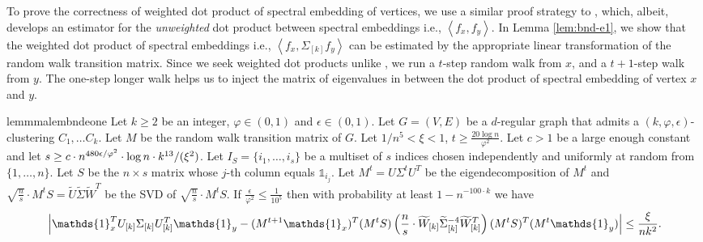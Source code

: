 \documentclass[letterpaper,11pt]{article}
\theoremstyle{plain}
\theoremstyle{definition}
\theoremstyle{remark}
\newcommand{\rdp}[1]
  {\ensuremath{\left\langle #1 \right\rangle}}
\newcommand{\mycolor}[1]{\textcolor{black}{#1}}
\begin{document}
To prove the correctness of weighted dot product of spectral embedding of vertices, we use a similar proof strategy to \cite{GluchKLMS21},  
which, albeit, develops an 
estimator for the \emph{unweighted} dot product  between spectral embeddings i.e., $\rdp{f_x, f_y}$. In Lemma \ref{lem:bnd-e1}, we show that the weighted dot product of
spectral embeddings i.e.,  $\rdp{f_x, \Sigma_{[k]}f_y}$ can be estimated by the appropriate linear transformation of the random walk transition matrix. Since we seek weighted dot products unlike \cite{GluchKLMS21},  we run a $t$-step random walk from $x$, and a $t+1$-step walk from $y$. The one-step longer walk helps us to inject the matrix of eigenvalues in between the dot product of spectral embedding of vertex $x$ and $y$. 



\begin{restatable}{lemmma}{lembndeone}
\label{lem:bnd-e1}
Let $k \geq 2$ be an integer, $\varphi \in (0,1)$ and $\epsilon\in (0,1)$. Let $G=(V,E)$ be a $d$-regular 
graph that admits a $(k,\varphi,\epsilon)$-clustering $C_1, \ldots C_k$. Let $M$ be  the random walk 
transition matrix of $G$. Let  $1/n^5 < \xi < 1$, $t\geq  \frac{20\log n}{\varphi^2}$. Let $c>1$ be a 
large enough constant and let 
$s\geq c
\cdot n^{480\epsilon / \varphi^2}\cdot \log n \cdot \mycolor{k^{13}}/({\xi}^2) $. 
Let $I_S=\{i_1,\ldots, i_s\}$ be a multiset of $s$ indices chosen independently and uniformly at random from
$\{1,\dots,n\}$. Let $S$ be the $n\times s$ matrix whose $j$-th column equals $\mathds{1}_{i_j}$.  
Let $M^t=U\Sigma^tU^T$ be the eigendecomposition of $M^t$ and 
$\sqrt{\frac{n}{s}} \cdot M^tS=\widetilde{U}\widetilde{\Sigma}\widetilde{W}^T$  be the SVD of 
$\sqrt{\frac{n}{s}} \cdot M^tS$. If $\frac{\epsilon}{\varphi^2}\leq \frac{1}{10^5}$ then with probability 
at least $1-n^{-100\cdot k}$ we have
\[\left|\mathds{1}_x^T U_{[k]}\Sigma_{[k]}{U}_{[k]}^T  \mathds{1}_y - (M^{t+1}\mathds{1}_{x})^T  (M^tS)\left(\frac{n}{s}\cdot\widetilde{W}_{[k]} \widetilde{\Sigma}^{-4}_{[k]} \widetilde{W}^T_{[k]}\right) (M^tS)^T (M^{t}\mathds{1}_{y}) \right| \leq  \frac{\xi}{\mycolor{n k^2}}\text{.}
\]
\end{restatable}
\end{document}
